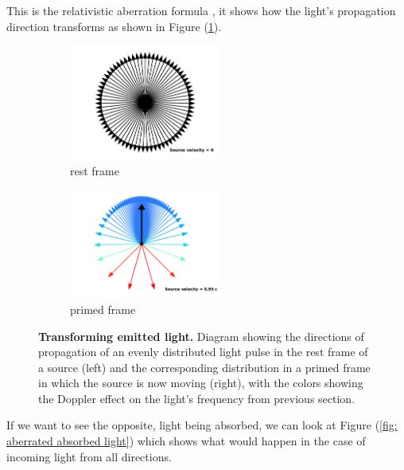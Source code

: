 This is the relativistic aberration formula \cite{einstein1905electrodynamics}, it shows how the light's propagation direction transforms as shown in Figure (\ref{fig: aberrated emitted light}).

\begin{figure}[H]
	\begin{subfigure}{.49\textwidth}
		\centering
		\includegraphics[width = 5cm]{images/pdf/Aberrated_velocities_restframe.pdf}
		\caption{rest frame}
	\end{subfigure}
	\begin{subfigure}{.49\textwidth}
		\centering
		\includegraphics[width = 5cm]{images/pdf/Aberrated_velocities.pdf}
		\caption{primed frame}
	\end{subfigure}
	\caption{\textbf{Transforming emitted light.} Diagram showing the directions of propagation of an evenly distributed light pulse in the rest frame of a source (left) and the corresponding distribution in a primed frame in which the source is now moving (right), with the colors showing the Doppler effect on the light's frequency from previous section.}
	\label{fig: aberrated emitted light}
\end{figure}

If we want to see the opposite, light being absorbed, we can look at Figure (\ref{fig: aberrated absorbed light}) which shows what would happen in the case of incoming light from all directions.

